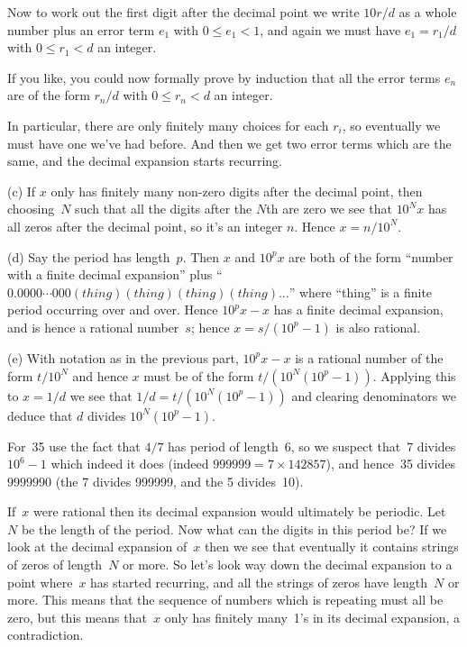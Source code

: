 \documentclass[10pt]{article}
\begin{document}
Now to work out the first digit after the decimal point we write $10r/d$ as a whole number plus an error term $e_1$ with $0\leq e_1<1$, and again we must have $e_1=r_1/d$ with $0\leq r_1<d$ an integer.

If you like, you could now formally prove by induction that all the error terms $e_n$ are of the form $r_n/d$ with $0\leq r_n<d$ an integer.

In particular, there are only finitely many choices for each $r_i$, so eventually we must have one we've had before. And then we get two error terms which are the same, and the decimal expansion starts recurring.

(c) If $x$ only has finitely many non-zero digits after the decimal point, then choosing~$N$ such that all the digits after the $N$th are zero we see that $10^Nx$ has all zeros after the decimal point, so it's an integer $n$. Hence $x=n/10^N$.

(d) Say the period has length~$p$. Then $x$ and $10^px$ are both of the form ``number with a finite decimal expansion'' plus ``$0.0000\cdots000(thing)(thing)(thing)(thing)\ldots$'' where ``thing'' is a finite period occurring over and over. Hence $10^px-x$ has a finite decimal expansion, and is hence a rational number~$s$; hence $x=s/(10^p-1)$ is also rational.

(e) With notation as in the previous part, $10^px-x$ is a rational number of the form $t/10^N$ and hence $x$ must be of the form $t/(10^N(10^p-1))$. Applying this to $x=1/d$ we see that $1/d=t/(10^N(10^p-1))$ and clearing denominators we deduce that $d$ divides $10^N(10^p-1)$.

For~35 use the fact that $4/7$ has period of length~6, so we suspect that~7 divides $10^6-1$ which indeed it does (indeed $999999=7\times142857$), and hence~35 divides $9999990$ (the 7 divides 999999, and the 5 divides~10).

\medskip{} If~$x$ were rational then its decimal expansion would ultimately be periodic. Let~$N$ be the length of the period. Now what can the digits in this period be? If we look at the decimal expansion of~$x$ then we see that eventually it contains strings of zeros of length~$N$ or more. So let's look way down the decimal expansion to a point where~$x$ has started recurring, and all the strings of zeros have length~$N$ or more. This means that the sequence of numbers which is repeating must all be zero, but this means that~$x$ only has finitely many~1's in its decimal expansion, a contradiction.
\end{document}

